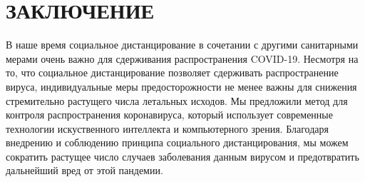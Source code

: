 \chapter*{ЗАКЛЮЧЕНИЕ}    

В наше время социальное дистанцирование в сочетании с другими санитарными мерами очень важно для сдерживания распространения COVID-19. Несмотря на то, что социальное дистанцирование позволяет сдерживать распространение вируса, индивидуальные меры предосторожности не менее важны для снижения стремительно растущего числа летальных исходов. Мы предложили метод для контроля распространения коронавируса, который использует современные технологии искуственного интеллекта и компьютерного зрения. Благодаря внедрению и соблюдению принципа социального дистанцирования, мы можем сократить растущее число случаев заболевания данным вирусом и предотвратить дальнейший вред от этой пандемии.

\newpage